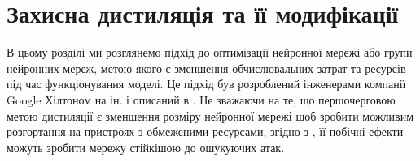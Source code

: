 \documentclass[14pt,a4paper]{extarticle}
\newcounter{e}
\newcounter{pic}
\newcommand{\pic}[1]{\refstepcounter{pic} \vspace{-0.3cm}\textit{Рисунок \arabic{pic}\label{#1}.}}
\numberwithin{equation}{section}
\numberwithin{figure}{section}
\begin{document}
 

 
 
 \newpage
 \thispagestyle{empty}
 \section{Захисна дистиляція та її модифікації}
 В цьому розділі ми розглянемо підхід до оптимізації нейронної мережі або групи нейронних мереж, метою якого є зменшення обчислювальних затрат та ресурсів під час функціонування моделі. Це підхід був розроблений інженерами компанії Google Хілтоном на ін. і описаний в \cite{distillation}. Не зважаючи на те, що першочерговою метою дистиляції є зменшення розміру нейронної мережі щоб зробити можливим розгортання на пристроях з обмеженими ресурсами, згідно з \cite{defencive-distillation}, її побічні ефекти можуть зробити мережу стійкішою до ошукуючих атак.
 
\end{document}
